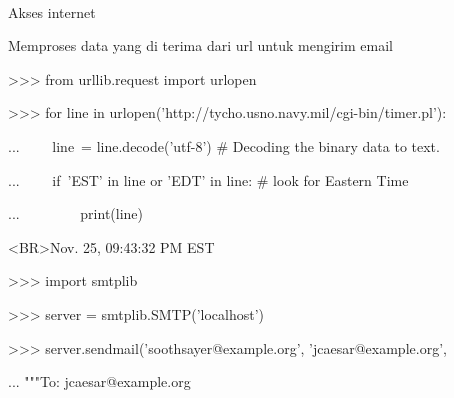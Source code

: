 \noindent 
{\fontsize{14pt}{14pt} \\} \par
\vspace{14pt}
\noindent 
{\fontsize{14pt}{14pt}\selectfont Akses internet \\} \par
\noindent 
{\fontsize{14pt}{14pt}\selectfont Memproses data yang di terima dari url untuk mengirim email \\} \par
\vspace{14pt}
\noindent 
{\fontsize{14pt}{14pt}\selectfont >>> from urllib.request import urlopen \\} \par
\vspace{14pt}
\noindent 
{\fontsize{14pt}{14pt}\selectfont >>> for line in urlopen('http://tycho.usno.navy.mil/cgi-bin/timer.pl'): \\} \par
\noindent 
{\fontsize{14pt}{14pt}\selectfont ...~~~~ line~= line.decode('utf-8')   $  \#  $ Decoding the binary data to text. \\} \par
\noindent 
{\fontsize{14pt}{14pt}\selectfont ...~~~~ if~'EST' in line or 'EDT' in line:   $  \#  $ look for Eastern Time \\} \par
\noindent 
{\fontsize{14pt}{14pt}\selectfont ...~~~~~~~~ print(line) \\} \par
\vspace{14pt}
\noindent 
{\fontsize{14pt}{14pt}\selectfont <BR>Nov. 25, 09:43:32 PM EST \\} \par
\vspace{14pt}
\noindent 
{\fontsize{14pt}{14pt}\selectfont >>> import smtplib \\} \par
\vspace{14pt}
\noindent 
{\fontsize{14pt}{14pt}\selectfont >>> server = smtplib.SMTP('localhost') \\} \par
\vspace{14pt}
\noindent 
{\fontsize{14pt}{14pt}\selectfont >>> server.sendmail('soothsayer@example.org', 'jcaesar@example.org', \\} \par
\noindent 
{\fontsize{14pt}{14pt}\selectfont ... """To: jcaesar@example.org \\} \par
